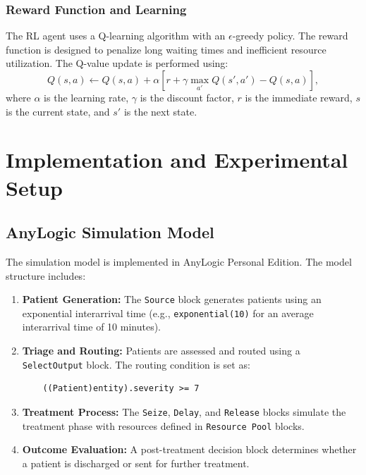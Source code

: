 \documentclass[12pt]{article}
\begin{document}
\subsubsection{Reward Function and Learning}
The RL agent uses a Q-learning algorithm with an $\epsilon$-greedy policy. The reward function is designed to penalize long waiting times and inefficient resource utilization. The Q-value update is performed using:
\begin{equation}
    Q(s,a) \leftarrow Q(s,a) + \alpha \left[ r + \gamma \max_{a'} Q(s',a') - Q(s,a) \right],
\end{equation}
where $\alpha$ is the learning rate, $\gamma$ is the discount factor, $r$ is the immediate reward, $s$ is the current state, and $s'$ is the next state.

\section{Implementation and Experimental Setup} \label{sec:implementation}
\subsection{AnyLogic Simulation Model}
The simulation model is implemented in AnyLogic Personal Edition. The model structure includes:
\begin{enumerate}[noitemsep]
    \item \textbf{Patient Generation:} The \texttt{Source} block generates patients using an exponential interarrival time (e.g., \texttt{exponential(10)} for an average interarrival time of 10 minutes).
    \item \textbf{Triage and Routing:} Patients are assessed and routed using a \texttt{SelectOutput} block. The routing condition is set as:
    \begin{verbatim}
    ((Patient)entity).severity >= 7
    \end{verbatim}
    \item \textbf{Treatment Process:} The \texttt{Seize}, \texttt{Delay}, and \texttt{Release} blocks simulate the treatment phase with resources defined in \texttt{Resource Pool} blocks.
    \item \textbf{Outcome Evaluation:} A post-treatment decision block determines whether a patient is discharged or sent for further treatment.
\end{enumerate}
\end{document}
